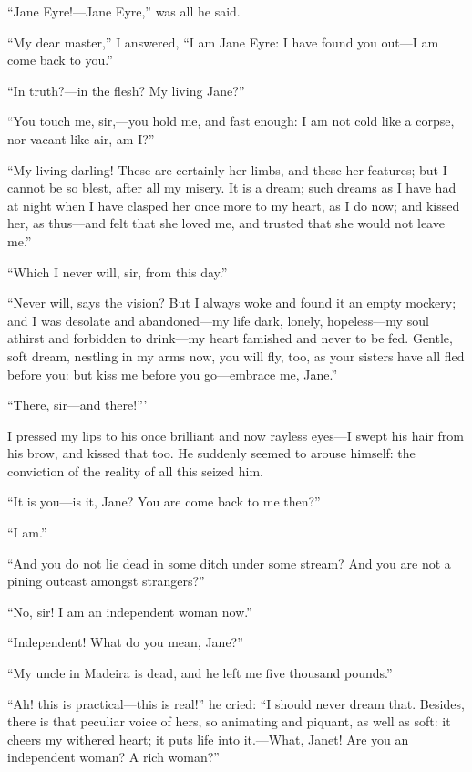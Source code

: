 \enquote{Jane Eyre!---Jane Eyre,} was all he said.

\enquote{My dear master,} I answered, \enquote{I am Jane Eyre: I have
found you out---I am come back to you.}

\enquote{In truth?---in the flesh? My living Jane?}

\enquote{You touch me, sir,---you hold me, and fast enough: I am not
cold like a corpse, nor vacant like air, am I?}

\enquote{My living darling! These are certainly her limbs, and these
her features; but I cannot be so blest, after all my misery. It is a
dream; such dreams as I have had at night when I have clasped her once
more to my heart, as I do now; and kissed her, as thus---and felt that
she loved me, and trusted that she would not leave me.}

\enquote{Which I never will, sir, from this day.}

\enquote{Never will, says the vision? But I always woke and found it an
empty mockery; and I was desolate and abandoned---my life dark, lonely,
hopeless---my soul athirst and forbidden to drink---my heart famished
and never to be fed. Gentle, soft dream, nestling in my arms now, you
will fly, too, as your sisters have all fled before you: but kiss me
before you go---embrace me, Jane.}

\enquote{There, sir---and there!}'

I pressed my lips to his once brilliant and now rayless eyes---I swept
his hair from his brow, and kissed that too. He suddenly seemed to
arouse himself: the conviction of the reality of all this seized him.

\enquote{It is you---is it, Jane? You are come back to me then?}

\enquote{I am.}

\enquote{And you do not lie dead in some ditch under some stream? And
you are not a pining outcast amongst strangers?}

\enquote{No, sir! I am an independent woman now.}

\enquote{Independent! What do you mean, Jane?}

\enquote{My uncle in Madeira is dead, and he left me five thousand
pounds.}

\enquote{Ah! this is practical---this is real!} he cried: \enquote{I
should never dream that. Besides, there is that peculiar voice of hers,
so animating and piquant, as well as soft: it cheers my withered heart;
it puts life into it.---What, Janet! Are you an independent woman? A
rich woman?}

